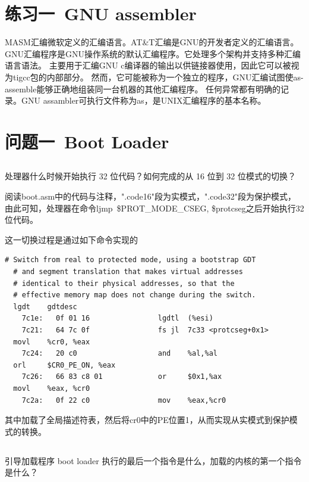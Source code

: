 \documentclass[12pt,a4paper,UTF8]{article}
\begin{document}
\section{练习一\ GNU assembler}

MASM汇编微软定义的汇编语言。AT\&T汇编是GNU的开发者定义的汇编语言。
GNU汇编程序是GNU操作系统的默认汇编程序。它处理多个架构并支持多种汇编语言语法。
主要用于汇编GNU c编译器的输出以供链接器使用，因此它可以被视为tigcc包的内部部分。
然而，它可能被称为一个独立的程序，GNU汇编试图使as-assemble能够正确地组装同一台机器的其他汇编程序。
任何异常都有明确的记录。GNU assambler可执行文件称为as，是UNIX汇编程序的基本名称。

\section{问题一\ Boot Loader}

    \subsection{}
	处理器什么时候开始执行 32 位代码？如何完成的从 16 位到 32 位模式的切换？

	阅读boot.asm中的代码与注释，".code16"段为实模式，".code32"段为保护模式，
	由此可知，处理器在命令ljmp\ \$PROT\_MODE\_CSEG, \$protcseg之后开始执行32位代码。

	这一切换过程是通过如下命令实现的
	\begin{lstlisting}[style=MASM]
  # Switch from real to protected mode, using a bootstrap GDT
  # and segment translation that makes virtual addresses 
  # identical to their physical addresses, so that the 
  # effective memory map does not change during the switch.
  lgdt    gdtdesc
    7c1e:	0f 01 16             	lgdtl  (%esi)
    7c21:	64 7c 0f             	fs jl  7c33 <protcseg+0x1>
  movl    %cr0, %eax
    7c24:	20 c0                	and    %al,%al
  orl     $CR0_PE_ON, %eax
    7c26:	66 83 c8 01          	or     $0x1,%ax
  movl    %eax, %cr0
    7c2a:	0f 22 c0             	mov    %eax,%cr0
	\end{lstlisting}

	其中加载了全局描述符表，然后将cr0中的PE位置1，从而实现从实模式到保护模式的转换。

    \subsection{}
	引导加载程序 boot loader 执行的最后一个指令是什么，加载的内核的第一个指令是什么？
\end{document}
